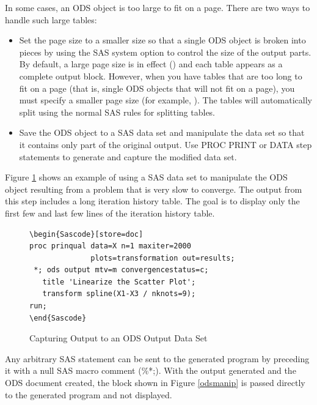 \documentclass[article,oneside]{memoir}
\begin{document}
  In some cases, an ODS object is too large to fit on a page.
  There are two ways to handle such large tables:
  \begin{itemize}
  \item Set the page size to a smaller size so that a single ODS object is broken into pieces
  by using the SAS system option to control the size of the output parts.
  By default, a large page size is
  in effect () and each table appears
  as a complete output block. However, when you have tables that are
  too long to fit on a page (that is, single ODS objects that will not fit on a page),
  you must specify a smaller page size
  (for example, ).
  The tables will automatically split using the normal SAS
  rules for splitting tables.

  \item Save the ODS object to a SAS data set and manipulate the data set
  so that it contains only part of the original output. Use PROC PRINT
  or DATA step statements to generate and capture the modified data set.

  \end{itemize}

  Figure \ref{odsdataset} shows an
  example of using a SAS data set to manipulate
  the ODS object resulting from a problem that is very
  slow to converge. The output from this step includes a long iteration
  history table.
  The goal is to display only the first few and last few lines of
  the iteration history table.

\begin{figure}[H]
\begin{snugshade}
\begin{verbatim}
\begin{Sascode}[store=doc]
proc prinqual data=X n=1 maxiter=2000
              plots=transformation out=results;
 *; ods output mtv=m convergencestatus=c;
   title 'Linearize the Scatter Plot';
   transform spline(X1-X3 / nknots=9);
run;
\end{Sascode}
\end{verbatim}
\end{snugshade}
\caption{Capturing Output to an ODS Output Data Set}\label{odsdataset}
\end{figure}

  Any arbitrary SAS statement can be sent to the generated program by preceding
  it with a null SAS macro comment (\%*;).
  With the output generated and the ODS document  created,
  the  block shown in Figure \ref{odsmanip} is passed directly
  to the generated program and not displayed.
\end{document}

